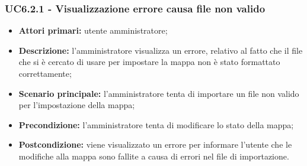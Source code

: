 \subsubsection{UC6.2.1 - Visualizzazione errore causa file non valido}
\begin{itemize}
	\item \textbf{Attori primari:} utente amministratore;
	\item \textbf{Descrizione:} l'amministratore visualizza un errore, relativo al fatto che il file che si è cercato di usare per impostare la mappa non è stato formattato correttamente;
	\item \textbf{Scenario principale:} l'amministratore tenta di importare un file non valido per l'impostazione della mappa;
	\item \textbf{Precondizione:} l'amministratore tenta di modificare lo stato della mappa;
	\item \textbf{Postcondizione:} viene visualizzato un errore per informare l'utente che le modifiche alla mappa sono fallite a causa di errori nel file di importazione.
\end{itemize}

